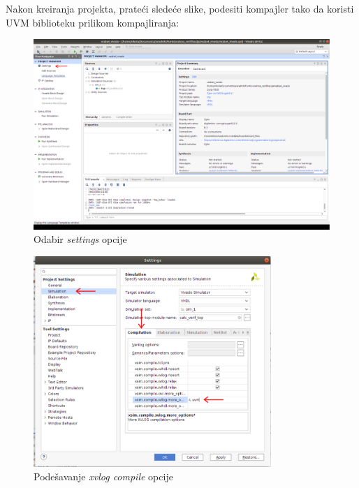 \pagebreak
Nakon kreiranja projekta, prateći sledeće slike, podesiti kompajler tako da
koristi UVM biblioteku prilikom kompajliranja:
\begin{figure}[h!]
  \centering
  \includegraphics[width=150mm, scale=0.5]{img/v4_vivado_settings.png}
  \caption{Odabir \emph{settings} opcije}
  \label{fig:v4_vivado_settings}
\end{figure}

\begin{figure}[h!]
  \centering
  \includegraphics[width=90mm, scale=0.5]{img/v5_vivado_set_uvm_lib.png}
  \caption{Podešavanje \emph{xvlog compile} opcije}
  \label{fig:v5_vivado_set_uvm_lib}
\end{figure}

